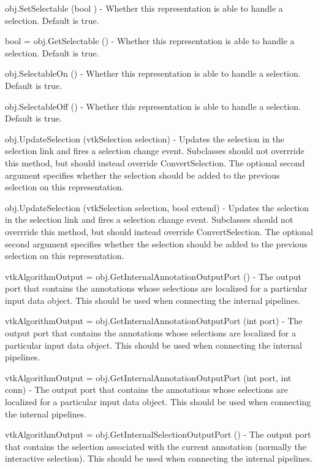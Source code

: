 \begin{DoxyItemize}
\item {\ttfamily obj.\-Set\-Selectable (bool )} -\/ Whether this representation is able to handle a selection. Default is true.  
\item {\ttfamily bool = obj.\-Get\-Selectable ()} -\/ Whether this representation is able to handle a selection. Default is true.  
\item {\ttfamily obj.\-Selectable\-On ()} -\/ Whether this representation is able to handle a selection. Default is true.  
\item {\ttfamily obj.\-Selectable\-Off ()} -\/ Whether this representation is able to handle a selection. Default is true.  
\item {\ttfamily obj.\-Update\-Selection (vtk\-Selection selection)} -\/ Updates the selection in the selection link and fires a selection change event. Subclasses should not overrride this method, but should instead override Convert\-Selection. The optional second argument specifies whether the selection should be added to the previous selection on this representation.  
\item {\ttfamily obj.\-Update\-Selection (vtk\-Selection selection, bool extend)} -\/ Updates the selection in the selection link and fires a selection change event. Subclasses should not overrride this method, but should instead override Convert\-Selection. The optional second argument specifies whether the selection should be added to the previous selection on this representation.  
\item {\ttfamily vtk\-Algorithm\-Output = obj.\-Get\-Internal\-Annotation\-Output\-Port ()} -\/ The output port that contains the annotations whose selections are localized for a particular input data object. This should be used when connecting the internal pipelines.  
\item {\ttfamily vtk\-Algorithm\-Output = obj.\-Get\-Internal\-Annotation\-Output\-Port (int port)} -\/ The output port that contains the annotations whose selections are localized for a particular input data object. This should be used when connecting the internal pipelines.  
\item {\ttfamily vtk\-Algorithm\-Output = obj.\-Get\-Internal\-Annotation\-Output\-Port (int port, int conn)} -\/ The output port that contains the annotations whose selections are localized for a particular input data object. This should be used when connecting the internal pipelines.  
\item {\ttfamily vtk\-Algorithm\-Output = obj.\-Get\-Internal\-Selection\-Output\-Port ()} -\/ The output port that contains the selection associated with the current annotation (normally the interactive selection). This should be used when connecting the internal pipelines.  

\end{DoxyItemize}
